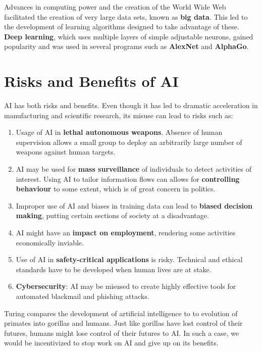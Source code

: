 \documentclass{article}
\begin{document}
Advances in computing power and the creation of the World Wide Web
facilitated the creation of very large data sets, known as \textbf{big data}.
This led to the development of learning algorithms designed to
take advantage of these. \textbf{Deep learning}, which uses
multiple layers of simple adjustable neurons, gained popularity
and was used in several programs such as \textbf{AlexNet} and \textbf{AlphaGo}.

\section{Risks and Benefits of AI}

AI has both risks and benefits. Even though it has led to dramatic
acceleration in manufacturing and scientific research, its misuse
can lead to risks such as:
\begin{enumerate}
    \item Usage of AI in \textbf{lethal autonomous weapons}. Absence
        of human supervision allows a small group to deploy an 
        arbitrarily large number of weapons against human targets.
    \item AI may be used for \textbf{mass surveillance} of individuals
        to detect activities of interest. Using AI to tailor
        information flows can allows for \textbf{controlling behaviour}
        to some extent, which is of great concern in politics.
    \item Improper use of AI and biases in training data can lead
        to \textbf{biased decision making}, putting certain sections of
        society at a disadvantage.
    \item AI might have an \textbf{impact on employment}, rendering some
        activities economically inviable. 
    \item Use of AI in \textbf{safety-critical applications} is risky.
        Technical and ethical standards have to be developed when human
        lives are at stake.
    \item \textbf{Cybersecurity}: AI may be misused to create highly
        effective tools for automated blackmail and phishing attacks.
\end{enumerate}

Turing compares the development of artificial intelligence to to
evolution of primates into gorillas and humans. Just like gorillas
have lost control of their futures, humans might lose control of 
their futures to AI. In such a case, we would be incentivized to
stop work on AI and give up on its benefits.
\end{document}
